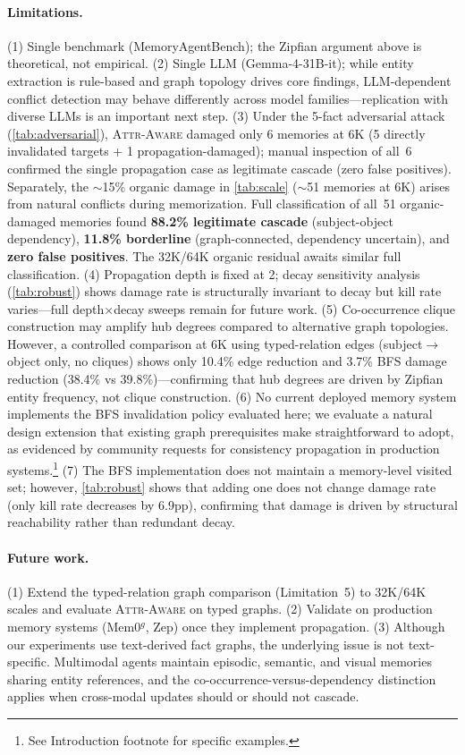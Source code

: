 \documentclass{article}
\newcommand{\attraware}{\textsc{Attr-Aware}}
\begin{document}
\paragraph{Limitations.}
(1) Single benchmark (MemoryAgentBench); the Zipfian argument above is theoretical, not empirical.
(2) Single LLM (Gemma-4-31B-it); while entity extraction is rule-based and graph topology drives core findings, LLM-dependent conflict detection may behave differently across model families---replication with diverse LLMs is an important next step.
(3) Under the 5-fact adversarial attack (\cref{tab:adversarial}), \attraware{} damaged only 6 memories at 6K (5 directly invalidated targets + 1 propagation-damaged); manual inspection of all~6 confirmed the single propagation case as legitimate cascade (zero false positives).
Separately, the ${\sim}$15\% organic damage in \cref{tab:scale} (${\sim}$51 memories at 6K) arises from natural conflicts during memorization.
Full classification of all~51 organic-damaged memories found \textbf{88.2\% legitimate cascade} (subject-object dependency), \textbf{11.8\% borderline} (graph-connected, dependency uncertain), and \textbf{zero false positives}.
The 32K/64K organic residual awaits similar full classification.
(4) Propagation depth is fixed at 2; decay sensitivity analysis (\cref{tab:robust}) shows damage rate is structurally invariant to decay but kill rate varies---full depth$\times$decay sweeps remain for future work.
(5) Co-occurrence clique construction may amplify hub degrees compared to alternative graph topologies.
However, a controlled comparison at 6K using typed-relation edges (subject$\rightarrow$object only, no cliques) shows only 10.4\% edge reduction and 3.7\% BFS damage reduction (38.4\% vs 39.8\%)---confirming that hub degrees are driven by Zipfian entity frequency, not clique construction.
(6) No current deployed memory system implements the BFS invalidation policy evaluated here; we evaluate a natural design extension that existing graph prerequisites make straightforward to adopt, as evidenced by community requests for consistency propagation in production systems.\footnote{See Introduction footnote for specific examples.}
(7) The BFS implementation does not maintain a memory-level visited set; however, \cref{tab:robust} shows that adding one does not change damage rate (only kill rate decreases by 6.9pp), confirming that damage is driven by structural reachability rather than redundant decay.

\paragraph{Future work.}
(1) Extend the typed-relation graph comparison (Limitation~5) to 32K/64K scales and evaluate \attraware{} on typed graphs.
(2) Validate on production memory systems (Mem0$^g$, Zep) once they implement propagation.
(3) Although our experiments use text-derived fact graphs, the underlying issue is not text-specific.
Multimodal agents maintain episodic, semantic, and visual memories sharing entity references, and the co-occurrence-versus-dependency distinction applies when cross-modal updates should or should not cascade.
\end{document}

